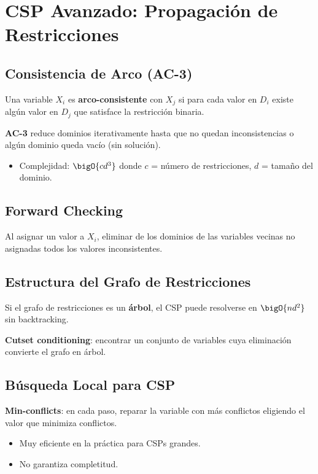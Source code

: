 \section{CSP Avanzado: Propagación de Restricciones}

\subsection{Consistencia de Arco (AC-3)}

Una variable $X_i$ es \textbf{arco-consistente} con $X_j$ si para cada valor en $D_i$ existe algún valor en $D_j$ que satisface la restricción binaria.

\textbf{AC-3} reduce dominios iterativamente hasta que no quedan inconsistencias o algún dominio queda vacío (sin solución).

\begin{itemize}
    \item Complejidad: $\bigO{cd^3}$ donde $c$ = número de restricciones, $d$ = tamaño del dominio.
\end{itemize}

\subsection{Forward Checking}

Al asignar un valor a $X_i$, eliminar de los dominios de las variables vecinas no asignadas todos los valores inconsistentes.

\subsection{Estructura del Grafo de Restricciones}

Si el grafo de restricciones es un \textbf{árbol}, el CSP puede resolverse en $\bigO{nd^2}$ sin backtracking.

\textbf{Cutset conditioning}: encontrar un conjunto de variables cuya eliminación convierte el grafo en árbol.

\subsection{Búsqueda Local para CSP}

\textbf{Min-conflicts}: en cada paso, reparar la variable con más conflictos eligiendo el valor que minimiza conflictos.

\begin{itemize}
    \item Muy eficiente en la práctica para CSPs grandes.
    \item No garantiza completitud.
\end{itemize}
